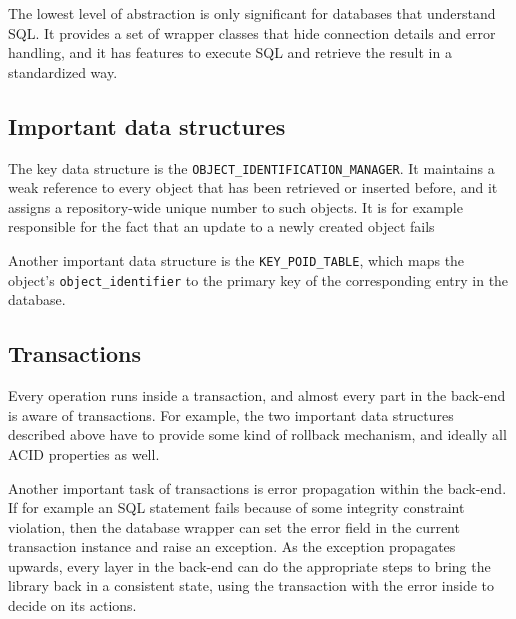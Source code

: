 \documentclass[a4paper,12pt]{report}
\begin{document}
The lowest level of abstraction is only significant for databases that understand SQL. 
It provides a set of wrapper classes that hide connection details and error handling, and it has features to execute SQL and retrieve the result in a standardized way.

\subsection{Important data structures}

The key data structure is the \lstinline!OBJECT_IDENTIFICATION_MANAGER!.
It maintains a weak reference to every object that has been retrieved or inserted before, and it assigns a repository-wide unique number to such objects.
It is for example responsible for the fact that an update to a newly created object fails 

Another important data structure is the \lstinline!KEY_POID_TABLE!, which maps the object's \lstinline!object_identifier! to the primary key of the corresponding entry in the database.

\subsection{Transactions}

Every operation runs inside a transaction, and almost every part in the back-end is aware of transactions.
For example, the two important data structures described above have to provide some kind of rollback mechanism, and ideally all ACID %
properties as well.

Another important task of transactions is error propagation within the back-end.
If for example an SQL statement fails because of some integrity constraint violation, then the database wrapper can set the error field in the current transaction instance and raise an exception.
As the exception propagates upwards, every layer in the back-end can do the appropriate steps to bring the library back in a consistent state, using the transaction with the error inside to decide on its actions.

% 
% 
\end{document}
